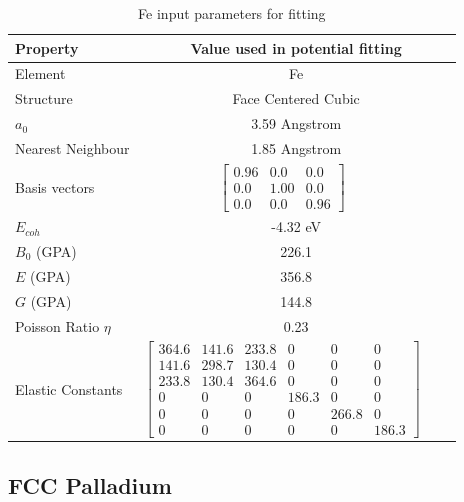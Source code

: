 \begin{table}[ht]
\renewcommand{\arraystretch}{1.2}
\begin{tabular}{lccc}
\hline\hline
Property & \multicolumn{3}{c}{Value used in potential fitting} \\
\hline\hline
Element & \multicolumn{3}{c}{Fe}\\
Structure             & \multicolumn{3}{c}{Face Centered Cubic}\\
$a_0$                 & \multicolumn{3}{c}{3.59 Angstrom}\\
Nearest Neighbour     & \multicolumn{3}{c}{1.85 Angstrom}\\
Basis vectors         & $\begin{bmatrix} 0.96 & 0.0 & 0.0 \\ 0.0 & 1.00 & 0.0 \\ 0.0 & 0.0 & 0.96  \end{bmatrix}$ \\
$E_{coh}$             & \multicolumn{3}{c}{-4.32 eV}   \\
$B_0$ (GPA)           & \multicolumn{3}{c}{226.1}   \\
$E$ (GPA)             & \multicolumn{3}{c}{356.8}   \\
$G$ (GPA)             & \multicolumn{3}{c}{144.8}   \\
Poisson Ratio $\eta$  & \multicolumn{3}{c}{0.23}   \\
Elastic Constants     & $\begin{bmatrix} 364.6 & 141.6 & 233.8 & 0 & 0 & 0 \\ 141.6 & 298.7 & 130.4 & 0 & 0 & 0 \\ 233.8 & 130.4 & 364.6 & 0 & 0 & 0 \\ 0 & 0 & 0 & 186.3 & 0 & 0 \\ 0 & 0 & 0 & 0 & 266.8 & 0 \\ 0 & 0 & 0 & 0 & 0 & 186.3 \end{bmatrix}$ \\
\hline\hline
\end{tabular}
\caption{Fe input parameters for fitting}
\label{table:feinputparameters}
\end{table}








\FloatBarrier
\subsection{FCC Palladium}

